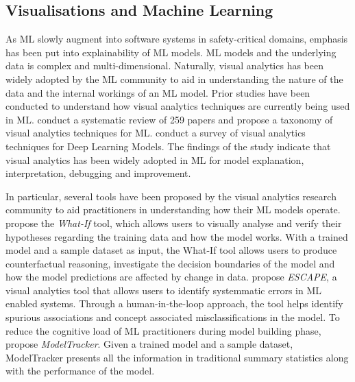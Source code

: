 \documentclass[acmsmall,screen,review,anonymous]{acmart}
\begin{document}
\subsection{Visualisations and Machine Learning}\label{sec:visualisations}


As ML slowly augment into software systems in safety-critical domains, emphasis has been put into explainability of ML models. ML models and the underlying data is complex and multi-dimensional. Naturally, visual analytics has been widely adopted by the ML community to aid in understanding the nature of the data and the internal workings of an ML model. Prior studies have been conducted to understand how visual analytics techniques are currently being used in ML. \citeauthor{yuan2021survey} conduct a systematic review of 259 papers and propose a taxonomy of visual analytics techniques for ML. \citeauthor{hohman2019visual} conduct a survey of visual analytics techniques for Deep Learning Models. The findings of the study indicate that visual analytics has been widely adopted in ML for model explanation, interpretation, debugging and improvement.

In particular, several tools have been proposed by the visual analytics research community to aid practitioners in understanding how their ML models operate. \citeauthor{wexler2020if} propose the \textit{What-If} tool, which allows users to visually analyse and verify their hypotheses regarding the training data and how the model works. With a trained model and a sample dataset as input, the What-If tool allows users to produce counterfactual reasoning, investigate the decision boundaries of the model and how the model predictions are affected by change in data. \citeauthor{ahn2023escape} propose \textit{ESCAPE}, a visual analytics tool that allows users to identify systemmatic errors in ML enabled systems. Through a human-in-the-loop approach, the tool helps identify spurious associations and concept associated misclassifications in the model. To reduce the cognitive load of ML practitioners during model building phase, \citeauthor{amershi2015modeltracker} propose \textit{ModelTracker}. Given a trained model and a sample dataset, ModelTracker presents all the information in traditional summary statistics along with the performance of the model.
\end{document}
